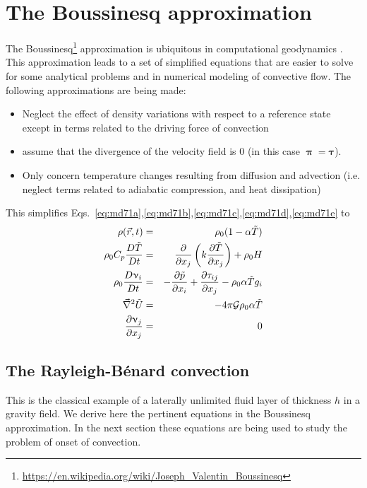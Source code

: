 \section{The Boussinesq approximation}

The Boussinesq\footnote{\url{https://en.wikipedia.org/wiki/Joseph_Valentin_Boussinesq}} 
approximation is ubiquitous in computational geodynamics \cite{spve60,yoka04}.
This approximation leads to a set of simplified equations that are easier to solve for some
analytical problems and in numerical modeling of convective flow. The following
approximations are being made:
\begin{itemize}
\item Neglect the effect of density variations with respect to a reference state 
except in terms related to the driving force of convection
\item assume that the divergence of the velocity field is 0 (in this 
case ${\bm \uppi}={\bm \tau}$).
\item Only concern temperature changes resulting from diffusion and advection 
(i.e. neglect terms related to adiabatic compression, and heat dissipation)
\end{itemize}

This simplifies Eqs.~\eqref{eq:md71a},\eqref{eq:md71b},\eqref{eq:md71c},\eqref{eq:md71d},\eqref{eq:md71e} 
to
\begin{eqnarray}
\rho(\vec{r},t) &=& \rho_0 (1-\alpha {\tilde T}) \\
\rho_0 C_p \frac{D {\tilde T} }{Dt} &=& \frac{\partial}{\partial x_j}
\left( k \frac{\partial {\tilde T}}{\partial x_j}  \right) + \rho_0 H \\
\rho_0 \frac{D\upnu_i}{Dt} &=& -\frac{\partial {\tilde p}}{\partial x_i}
+\frac{\partial \tau_{ij}}{\partial x_j} - \rho_0 \alpha {\tilde T} g_i \\
\vec\nabla^2 {\tilde U} &=& -4 \pi {\cal G} \rho_0 \alpha {\tilde T} \\
\frac{\partial \upnu_j}{\partial x_j} &=& 0
\end{eqnarray}

\subsection{The Rayleigh-B{\'e}nard convection}

This is the classical example of a laterally unlimited fluid layer of thickness $h$ in a gravity
field. We derive here the pertinent equations in the Boussinesq approximation.
In the next section these equations are being used to study the
problem of onset of convection.

